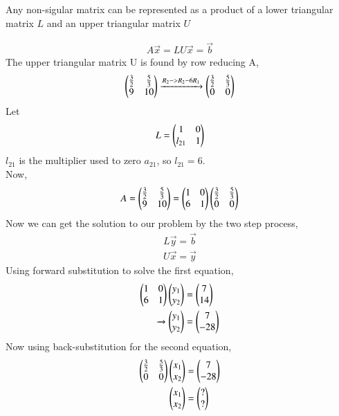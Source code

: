 \documentclass[journal]{IEEEtran}
\begin{document}
Any non-sigular matrix can be represented as a product of a lower triangular matrix $L$ and an
upper triangular matrix $U$

\begin{align}
    A\vec{x} = LU\vec{x} = \vec{b}
\end{align}
The upper triangular matrix U is found by row reducing A,
\begin{align}
    \begin{pmatrix}
        \frac{3}{2} & \frac{5}{3}\\
        9 & 10
    \end{pmatrix} \xrightarrow{R_2 -> R_2 -  6 R_1}  \begin{pmatrix}
        \frac{3}{2} & \frac{5}{3}\\
        0 & 0
    \end{pmatrix} 
\end{align}
Let 
\begin{align}
    L = \begin{pmatrix}1 & 0\\ l_{21} & 1\end{pmatrix}
\end{align}
$l_{21}$ is the multiplier used to zero $a_{21}$, so $l_{21} = 6$.\\
\newline
Now,
\begin{align}
   A =  \begin{pmatrix}
        \frac{3}{2} & \frac{5}{3}\\
        9 & 10
    \end{pmatrix} = \begin{pmatrix}1 & 0\\ 6 & 1\end{pmatrix} \begin{pmatrix}\frac{3}{2} & \frac{5}{3} \\ 0 & 0 \end{pmatrix}
\end{align}
Now we can get the solution to our problem by the two step process,
\begin{align}
    L\vec{y} = \vec{b}\\
    U\vec{x} = \vec{y}
\end{align}
Using forward substitution to solve the first equation,
\begin{align}
    \begin{pmatrix}1 & 0 \\ 6 & 1\end{pmatrix}\begin{pmatrix}y_1 \\ y_2\end{pmatrix} &= \begin{pmatrix}7 \\ 14\end{pmatrix}\\
    \xrightarrow{} \begin{pmatrix}y_1 \\ y_2\end{pmatrix} &= \begin{pmatrix}7 \\ -28\end{pmatrix} 
\end{align}
Now using back-substitution for the second equation,
\begin{align}
    \begin{pmatrix}\frac{3}{2} & \frac{5}{3} \\ 0 & 0 \end{pmatrix}\begin{pmatrix}x_1 \\ x_2\end{pmatrix} &= \begin{pmatrix}7 \\ -28\end{pmatrix} \\
    \begin{pmatrix}x_1 \\ x_2\end{pmatrix} &= \begin{pmatrix} ? \\ ?\end{pmatrix}
\end{align}
\end{document}
